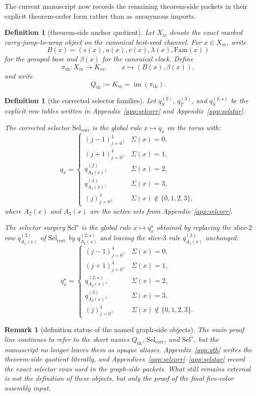\documentclass[11pt]{article}
\newtheorem{remark}[theorem]{Remark}
\newtheorem{definition}[theorem]{Definition}
\newcommand{\SelCorr}{\mathrm{Sel}_{\mathrm{corr}}}
\newcommand{\SelStar}{\mathrm{Sel}^{\star}}
\begin{document}
The current manuscript now records the remaining theorem-side packets in their
explicit theorem-order form rather than as anonymous imports.

\begin{definition}[theorem-side anchor quotient]
Let \(X_m\) denote the exact marked carry-jump-to-wrap object on the canonical
best-seed channel.
For \(x\in X_m\), write
\[
B(x)=(s(x),u(x),v(x),\lambda(x),\mathrm{Fam}(x))
\]
for the grouped base and \(\beta(x)\) for the canonical clock.
Define
\[
\pi_{\mathrm{th}}:X_m\to K_m,\qquad x\mapsto(B(x),\beta(x)),
\]
and write
\[
Q_{\mathrm{th}}:=K_m=\operatorname{im}(\pi_{\mathrm{th}}).
\]
\end{definition}

\begin{definition}[the corrected selector families]
Let \(q^{(2)}_S\), \(q^{(3)}_T\), and \(q^{(2,\star)}_S\) be the explicit row
tables written in Appendix~\ref{app:selcorr} and
Appendix~\ref{app:selstar}.

The corrected selector \(\SelCorr\) is the global rule \(x\mapsto q_x\) on the
torus with:
\[
q_x=
\begin{cases}
(j-1)_{j=0}^4, & \Sigma(x)=0,\\
(j+1)_{j=0}^4, & \Sigma(x)=1,\\
q^{(2)}_{A_2(x)}, & \Sigma(x)=2,\\
q^{(3)}_{A_3(x)}, & \Sigma(x)=3,\\
(j)_{j=0}^4, & \Sigma(x)\notin\{0,1,2,3\},
\end{cases}
\]
where \(A_2(x)\) and \(A_3(x)\) are the active sets from
Appendix~\ref{app:selcorr}.

The selector surgery \(\SelStar\) is the global rule \(x\mapsto q_x^\star\)
obtained by replacing the slice-\(2\) row \(q^{(2)}_{A_2(x)}\) of
\(\SelCorr\) by \(q^{(2,\star)}_{A_2(x)}\) and leaving the slice-\(3\) rule
\(q^{(3)}_{A_3(x)}\) unchanged:
\[
q^\star_x=
\begin{cases}
(j-1)_{j=0}^4, & \Sigma(x)=0,\\
(j+1)_{j=0}^4, & \Sigma(x)=1,\\
q^{(2,\star)}_{A_2(x)}, & \Sigma(x)=2,\\
q^{(3)}_{A_3(x)}, & \Sigma(x)=3,\\
(j)_{j=0}^4, & \Sigma(x)\notin\{0,1,2,3\}.
\end{cases}
\]
\end{definition}

\begin{remark}[definition status of the named graph-side objects]
The main proof line continues to refer to the short names
\(Q_{\mathrm{th}}\), \(\SelCorr\), and \(\SelStar\), but the manuscript no
longer leaves them as opaque aliases.
Appendix~\ref{app:qth} writes the theorem-side quotient literally, and
Appendices~\ref{app:selcorr}--\ref{app:selstar} record the exact selector rows
used in the graph-side packets.
What still remains external is not the definition of these objects, but only
the proof of the final five-color assembly input.
\end{remark}
\end{document}
